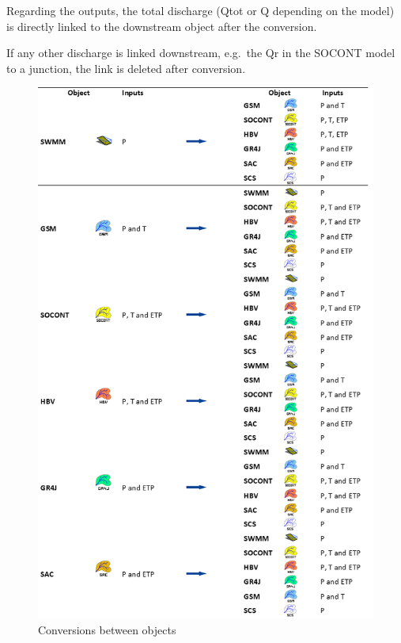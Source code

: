 \documentclass[
  letterpaper,
  DIV=11,
  numbers=noendperiod]{scrreprt}
\begin{document}
Regarding the outputs, the total discharge (Qtot or Q depending on the
model) is directly linked to the downstream object after the conversion.

If any other discharge is linked downstream, e.g.~the Qr in the SOCONT
model to a junction, the link is deleted after conversion.

\begin{figure}

{\centering \includegraphics{./figures/fig-conversion_between_objects.png}

}

\caption{\label{fig-conversion_between_objects}Conversions between
objects}

\end{figure}
\end{document}
